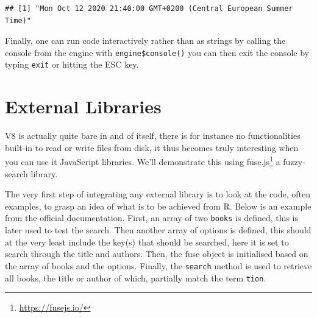 \documentclass[
]{krantz}
\makeatletter
\newenvironment{Shaded}{\begin{snugshade}}{\end{snugshade}}
\newcommand{\CommentTok}[1]{\textcolor[rgb]{0.37,0.37,0.37}{\textit{#1}}}
\newcommand{\KeywordTok}[1]{\textcolor[rgb]{0.27,0.27,0.27}{\textbf{#1}}}
\newcommand{\NormalTok}[1]{#1}
\newcommand{\OperatorTok}[1]{\textcolor[rgb]{0.43,0.43,0.43}{\textbf{#1}}}
\newcommand{\StringTok}[1]{\textcolor[rgb]{0.5,0.5,0.5}{#1}}
\renewcommand{\href}[2]{#2\footnote{\url{#1}}}
\newenvironment{kframe}{%
\medskip{}
\setlength{\fboxsep}{.8em}
 \def\at@end@of@kframe{}%
 \ifinner\ifhmode%
  \def\at@end@of@kframe{\end{minipage}}%
  \begin{minipage}{\columnwidth}%
 \fi\fi%
 \def\FrameCommand##1{\hskip\@totalleftmargin \hskip-\fboxsep
 \colorbox{shadecolor}{##1}\hskip-\fboxsep
     \hskip-\linewidth \hskip-\@totalleftmargin \hskip\columnwidth}%
 \MakeFramed {\advance\hsize-\width
   \@totalleftmargin\z@ \linewidth\hsize
   \@setminipage}}%
 {\par\unskip\endMakeFramed%
 \at@end@of@kframe}
\renewenvironment{Shaded}{\begin{kframe}}{\end{kframe}}
\makeatother
\begin{document}
\begin{Shaded}
\end{Shaded}

\begin{verbatim}
## [1] "Mon Oct 12 2020 21:40:00 GMT+0200 (Central European Summer Time)"
\end{verbatim}

Finally, one can run code interactively rather than as strings by calling the console from the engine with \texttt{engine\$console()} you can then exit the console by typing \texttt{exit} or hitting the ESC key.

\hypertarget{v8-external}{%
\section{External Libraries}\label{v8-external}}

V8 is actually quite bare in and of itself, there is for instance no functionalities built-in to read or write files from disk, it thus becomes truly interesting when you can use it JavaScript libraries. We'll demonstrate this using \href{https://fusejs.io/}{fuse.js} a fuzzy-search library.

The very first step of integrating any external library is to look at the code, often examples, to grasp an idea of what is to be achieved from R. Below is an example from the official documentation. First, an array of two \texttt{books} is defined, this is later used to test the search. Then another array of options is defined, this should at the very least include the key(s) that should be searched, here it is set to search through the title and authors. Then, the fuse object is initialised based on the array of books and the options. Finally, the \texttt{search} method is used to retrieve all books, the title or author of which, partially match the term \texttt{tion}.
\end{document}
